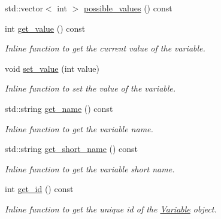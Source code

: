 \begin{DoxyCompactItemize}
std\-::vector$<$ int $>$ \hyperlink{classghost_1_1Variable_a71586778e7a059a3ea9aded506e3a952}{possible\-\_\-values} () const 
\item 
int \hyperlink{classghost_1_1Variable_a7bdebf8b2a369f337690ac38ece31793}{get\-\_\-value} () const 
\begin{DoxyCompactList}\small\item\em Inline function to get the current value of the variable. \end{DoxyCompactList}\item 
void \hyperlink{classghost_1_1Variable_a06f6c296986a017e1713961b4d763b0c}{set\-\_\-value} (int value)
\begin{DoxyCompactList}\small\item\em Inline function to set the value of the variable. \end{DoxyCompactList}\item 
std\-::string \hyperlink{classghost_1_1Variable_a394384e5e7f93364f9299448c03957b4}{get\-\_\-name} () const 
\begin{DoxyCompactList}\small\item\em Inline function to get the variable name. \end{DoxyCompactList}\item 
std\-::string \hyperlink{classghost_1_1Variable_a05b2b4bd59ce9afa1a156bb0d5b83063}{get\-\_\-short\-\_\-name} () const 
\begin{DoxyCompactList}\small\item\em Inline function to get the variable short name. \end{DoxyCompactList}\item 
int \hyperlink{classghost_1_1Variable_adc5da5dedaa3d47a5eb4092b08c3f77c}{get\-\_\-id} () const 
\begin{DoxyCompactList}\small\item\em Inline function to get the unique id of the \hyperlink{classghost_1_1Variable}{Variable} object. \end{DoxyCompactList}\end{DoxyCompactItemize}
